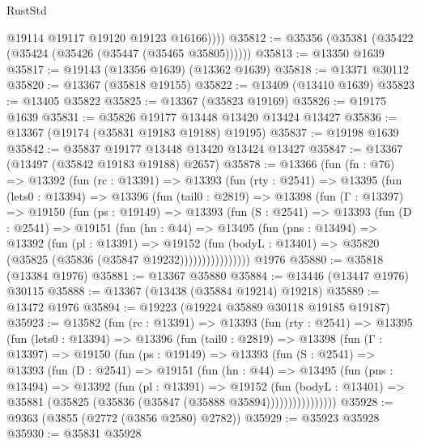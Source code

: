 \begin{lexlean}{RustStd}
\begin{coremodule}
            @19114
            @19117
            @19120
            @19123
            @16166))))
@35812 := @35356 (@35381 (@35422 (@35424 (@35426 (@35447 (@35465 @35805))))))
@35813 := @13350 @1639
@35817 := @19143 (@13356 @1639) (@13362 @1639)
@35818 := @13371 @30112
@35820 := @13367 (@35818 @19155)
@35822 := @13409 (@13410 @1639)
@35823 := @13405 @35822
@35825 := @13367 (@35823 @19169)
@35826 := @19175 @1639
@35831 := @35826 @19177 @13448 @13420 @13424 @13427
@35836 := @13367 (@19174 (@35831 @19183 @19188) @19195)
@35837 := @19198 @1639
@35842 := @35837 @19177 @13448 @13420 @13424 @13427
@35847 := @13367 (@13497 (@35842 @19183 @19188) @2657)
@35878 := @13366
    (fun (fn : @76) =>
    @13392
      (fun (rc : @13391) =>
      @13393
        (fun (rty : @2541) =>
        @13395
          (fun (lets0 : @13394) =>
          @13396
            (fun (tail0 : @2819) =>
            @13398
              (fun (Γ : @13397) =>
              @19150
                (fun (ps : @19149) =>
                @13393
                  (fun (S : @2541) =>
                  @13393
                    (fun (D : @2541) =>
                    @19151
                      (fun (hn : @44) =>
                      @13495
                        (fun (pns : @13494) =>
                        @13392
                          (fun (pl : @13391) =>
                          @19152
                            (fun (bodyL : @13401) =>
                            @35820 (@35825 (@35836 (@35847 @19232))))))))))))))))
    @1976
@35880 := @35818 (@13384 @1976)
@35881 := @13367 @35880
@35884 := @13446 (@13447 @1976) @30115
@35888 := @13367 (@13438 (@35884 @19214) @19218)
@35889 := @13472 @1976
@35894 := @19223 (@19224 @35889 @30118 @19185 @19187)
@35923 := @13582
    (fun (rc : @13391) =>
    @13393
      (fun (rty : @2541) =>
      @13395
        (fun (lets0 : @13394) =>
        @13396
          (fun (tail0 : @2819) =>
          @13398
            (fun (Γ : @13397) =>
            @19150
              (fun (ps : @19149) =>
              @13393
                (fun (S : @2541) =>
                @13393
                  (fun (D : @2541) =>
                  @19151
                    (fun (hn : @44) =>
                    @13495
                      (fun (pns : @13494) =>
                      @13392
                        (fun (pl : @13391) =>
                        @19152
                          (fun (bodyL : @13401) =>
                          @35881 (@35825 (@35836 (@35847 (@35888 @35894))))))))))))))))
@35928 := @9363 (@3855 (@2772 (@3856 @2580) @2782))
@35929 := @35923 @35928
@35930 := @35831 @35928

\end{coremodule}
\end{lexlean}
